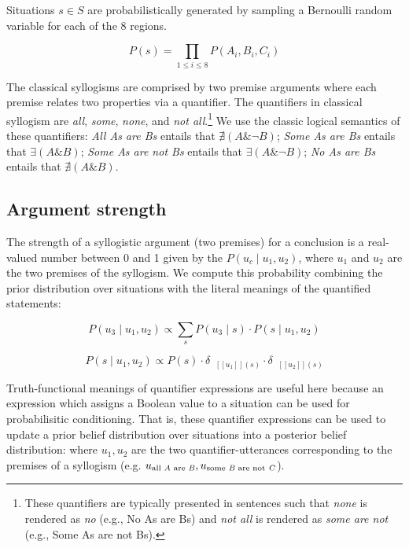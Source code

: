 \documentclass[floatsintext, man]{apa6}
\newcommand{\denote}[1]{\mbox{ $[\![ #1 ]\!]$}}
\begin{document}
Situations $s \in S$ are probabilistically generated by sampling a Bernoulli random variable for each of the 8 regions. 

$$P(s) = \prod_{1\leq i\leq  8} P(A_{i}, B_{i}, C_{i}) $$%

The classical syllogisms are comprised by two premise arguments where each premise relates two properties via a quantifier. 
The quantifiers in classical syllogism are \emph{all}, \emph{some}, \emph{none}, and \emph{not all}.\footnote{
These quantifiers are typically presented in sentences such that \emph{none} is rendered as \emph{no} (e.g., No As are Bs) and \emph{not all} is rendered as \emph{some are not} (e.g., Some As are not Bs).
}
We use the classic logical semantics of these quantifiers: \emph{All As are Bs} entails that $\nexists (A \& \neg B)$;  \emph{Some As are Bs} entails that $\exists (A \& B)$; \emph{Some As are not Bs} entails that $\exists (A \& \neg B)$; \emph{No As are Bs} entails that $\nexists (A \& B)$.

\subsection{Argument strength}

The strength of a syllogistic argument (two premises) for a conclusion is a real-valued number between 0 and 1 given by the $P(u_c \mid u_1, u_2)$, where $u_1$ and $u_2$ are the two premises of the syllogism.
We compute this probability combining the prior distribution over situations with the literal meanings of the quantified statements: 

$$
P(u_3 \mid u_1, u_2) \propto \sum_s P(u_3\mid s) \cdot P(s \mid u_1, u_2)
$$

$$P(s \mid u_1, u_2) \propto P(s)\cdot \delta_{\denote{u_1}(s)} \cdot \delta_{\denote{u_2}(s)} $$


Truth-functional meanings of quantifier expressions are useful here because an expression which assigns a Boolean value to a situation can be used for probabilisitic conditioning. That is, these quantifier expressions can be used to update a prior belief distribution over situations into a posterior belief distribution: 
where $u_1, u_2$ are the two quantifier-utterances corresponding to the premises of a syllogism (e.g. $u_{\textrm{all  \emph{A} are \emph{B}}}, u_{\textrm{some  \emph{B} are not \emph{C}}}$).
\end{document}

